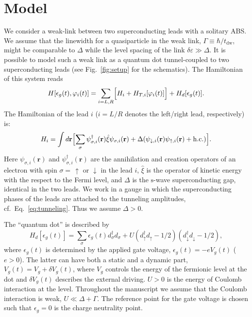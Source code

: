 \documentclass[aps,reprint,longbibliography, prb]{revtex4-2}
\begin{document}
\section{Model\label{sec:model}}
{We consider a weak-link between two superconducting leads with a solitary ABS. We assume that the linewidth for a quasiparticle in the weak link, $\Gamma\equiv \hbar/t_\mathrm{dw}$, might be comparable to $\Delta$ while the level spacing of the link $\delta\varepsilon \gg \Delta$.
It is possible to model such a weak link as a quantum dot tunnel-coupled to two superconducting leads (see Fig.~\ref{fig:setup} for the schematics).} The Hamiltonian of this system reads
\begin{equation}
\label{eq:model}
H[\epsilon_g(t), \varphi_{i}(t)] =\sum_{i=L,R}\Bigl[ H_{i} + H_{T,i}[\varphi_{i}(t)]\Bigr]+H_{d}[\epsilon_g (t)].
\end{equation}
The Hamiltonian of the lead $i$ ($i=L/R$ denotes the left/right lead, respectively) is:
\begin{equation}
H_i=\int d \mathbf{r} \Bigl[\sum_\sigma\psi_{\sigma,i}^\dagger(\mathbf r)\hat{\xi} \psi_{\sigma,i}(\mathbf r)+\Delta (\psi_{\downarrow,i}(\mathbf r) \psi_{\uparrow,i}(\mathbf r)+\mathrm{h.c.})\Bigr].
\end{equation}
Here $\psi_{\sigma, i}(\mathbf r)$ and $\psi_{\sigma,i}^\dagger( \mathbf r)$ are the annihilation and creation operators of an electron with spin $\sigma =\,\uparrow$ or $\downarrow$ in the lead $i$,
$\hat{\xi}$ is the operator of kinetic energy with the respect to the Fermi level, and
$\Delta$ is the $\mathrm{s}$-wave superconducting gap, identical in the two leads. We work in a gauge in which the superconducting phases of the leads are attached to the tunneling amplitudes, cf.~Eq.~\eqref{eq:tunneling}. Thus we assume $\Delta > 0$.

The ``quantum dot'' is described by
\begin{equation}
\label{eq:res-lev}
H_{d}[\epsilon_g (t)] =\sum_{\sigma}\epsilon_g (t) d_{\sigma}^{\dagger}d_{\sigma} + U (d_\uparrow^\dagger d_\uparrow-1/2)(d_\downarrow^\dagger d_\downarrow - 1/2),
\end{equation}
where $\epsilon_g(t)$ is determined by the applied gate voltage, $\epsilon_g(t)= - e V_g(t)$ ($e>0$). The latter can have both a static and a dynamic part, $V_g(t) = V_g + \delta V_g(t)$, where $V_g$ controls the energy of the fermionic level at the dot and $\delta V_g(t)$ describes the external driving. $U>0$ is the energy of Coulomb interaction at the level. Throughout the manuscript we assume that the Coulomb interaction is weak, $U \ll \Delta + \Gamma$. The reference point for the gate voltage is chosen such that $\epsilon_g = 0$ is the charge neutrality point.
\end{document}
